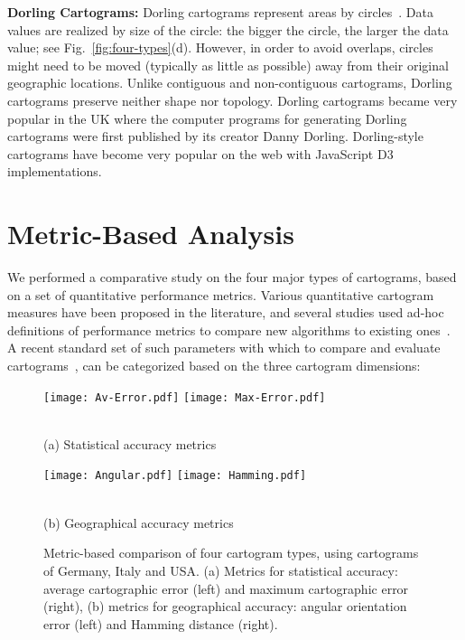 \documentclass[10pt,journal,compsoc]{IEEEtran}
\begin{document}
\textbf{Dorling Cartograms:} 
Dorling cartograms represent areas by circles~\cite{dorling96}.
Data values are realized by size of the circle: the bigger the circle, the larger the data value; see Fig.~\ref{fig:four-types}(d). 
 However, in order to avoid overlaps, circles might need to be moved (typically as little as possible) away from their original geographic locations. Unlike contiguous and non-contiguous cartograms, Dorling cartograms preserve neither shape nor topology.
Dorling cartograms became very popular in the UK where the computer programs for generating Dorling cartograms were first published by its creator Danny Dorling. 
Dorling-style cartograms have become very popular on the web with JavaScript D3 implementations.






\section{Metric-Based Analysis}

We performed a comparative study on the four major types of cartograms, based on a set of quantitative performance metrics.
Various quantitative cartogram measures have been proposed in the literature, and several studies used ad-hoc definitions of performance metrics to compare new algorithms to existing ones~\cite{BSV12,KNPS03,ks07,BMS10}.  A recent standard set of such parameters with which to compare and evaluate cartograms~\cite{AKV15}, can be categorized based on the three cartogram dimensions:

\begin{figure}[h]
\centering
\parbox{0.5\textwidth}
{\hspace{-0.4cm}
\texttt{[image: Av-Error.pdf]}
\texttt{[image: Max-Error.pdf]}
}\\
(a) Statistical accuracy metrics\\
\parbox{0.5\textwidth}
{\hspace{-0.4cm}
\texttt{[image: Angular.pdf]}
\texttt{[image: Hamming.pdf]}
}\\
(b) Geographical accuracy metrics\\
\caption{\small Metric-based comparison of four cartogram types, using cartograms of Germany, Italy and USA. (a) Metrics for statistical accuracy: average cartographic error (left) and maximum cartographic error (right), (b) metrics for geographical accuracy: angular orientation error (left) and Hamming distance (right).}
\label{fig:metric}
\end{figure}
\end{document}
